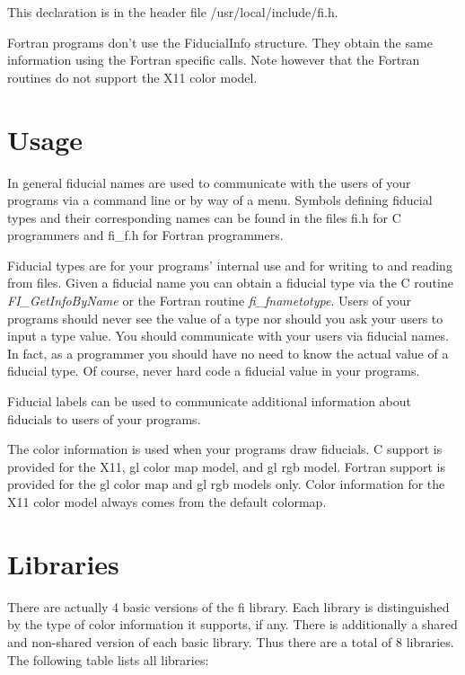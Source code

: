 \documentclass[letterpaper,11pt]{article}
\newcommand{\itt}[1]{{\ttfamily #1}}
\begin{document}
This declaration is in the header file /usr/local/include/fi.h.

Fortran programs don't use the \itt{FiducialInfo} structure.  They obtain the
same information using the Fortran specific calls.  Note however that the
Fortran routines do not support the X11 color model.

\section{Usage}

In general fiducial names are used to communicate with the users of your
programs via a command line or by way of a menu.  Symbols defining
fiducial types and their corresponding names can be found in the files 
\itt{fi.h}
for C programmers and \itt{fi\_f.h} for Fortran programmers.

Fiducial types are for your programs' internal use and for writing to and
reading from files.  Given a fiducial name you can obtain a fiducial type
via the C routine \emph{FI\_GetInfoByName} or the Fortran routine
\emph{fi\_fnametotype}. Users of your programs should never see the value of a
type nor should you ask your users to input a type value.  You should
communicate with your users via fiducial names.  In fact, as a programmer
you should have no need to know the actual value of a fiducial type.  Of
course, never hard code a fiducial value in your programs.

Fiducial labels can be used to communicate additional information about
fiducials to users of your programs.

The color information is used when your programs draw fiducials.  C support
is provided for the X11, gl color map model, and gl rgb model.  Fortran
support is provided for the gl color map and gl rgb models only.  Color
information for the X11 color model always comes from the default colormap.

\section{Libraries}

There are actually 4 basic versions of the fi library.  Each library is
distinguished by the type of color information it supports, if any.  There
is additionally a shared and non-shared version of each basic library.
Thus there are a total of 8 libraries.  The following table lists all
libraries: 
\end{document}
